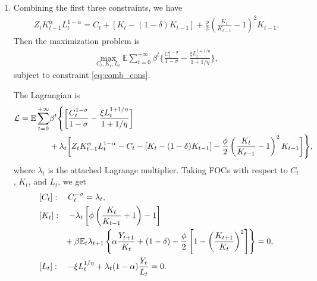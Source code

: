 \documentclass[12pt]{article}
\begin{document}
\begin{enumerate}[label=(\alph*)]
    \item Combining the first three constraints, we have
    \begin{align}\label{eq:comb_cons}
        Z_t K_{t-1}^{\alpha} L_t^{1-\alpha} = C_t + [K_t - (1-\delta)K_{t-1}] + \frac{\phi}{2} \left( \frac{K_t}{K_{t-1}} - 1 \right)^2 K_{t-1}.
    \end{align}
    Then the maximization problem is
    \begin{align}
        \max_{C_t, K_t, L_t} \mathbb{E} \sum_{t=0}^{+\infty} \beta^t \bigg\{\frac{C_t^{1-\sigma}}{1-\sigma} - \frac{\xi L_t^{1+1/\eta}}{1+1/\eta}\bigg\},
    \end{align}
    subject to constraint \eqref{eq:comb_cons}.

    The Lagrangian is
    \begin{align}\label{eq:lagrangian}
        \mathcal{L} = \mathbb{E} \sum_{t=0}^{+\infty} &\beta^t \Bigg\{ \bigg[\frac{C_t^{1-\sigma}}{1-\sigma} - \frac{\xi L_t^{1+1/\eta}}{1+1/\eta}\bigg] \notag \\
        &+ \lambda_t \bigg[Z_t K_{t-1}^{\alpha} L_t^{1-\alpha} - C_t - [K_t - (1-\delta)K_{t-1}] - \frac{\phi}{2} \left( \frac{K_t}{K_{t-1}} - 1 \right)^2 K_{t-1}\bigg]\Bigg\},
    \end{align}
    where $\lambda_t$ is the attached Lagrange multiplier. Taking FOCs with respect to $C_t$, $K_t$, and $L_t$, we get
    \begin{align}
        &[C_t]: \quad C_t^{-\sigma} = \lambda_t, \label{eq:foc_c}\\
        &[K_t]: \quad - \lambda_t \left[\phi\left(\frac{K_t}{K_{t-1}} + 1\right) - 1\right] \notag \\
        & \qquad \quad + \beta \mathbb{E}_t\lambda_{t+1} \left\{\alpha \frac{Y_{t+1}}{K_t} + (1-\delta) - \frac{\phi}{2} \left[1-\left(\frac{K_{t+1}}{K_t}\right)^2\right]\right\} = 0, \label{eq:foc_k}\\
        &[L_t]: \quad -\xi L_t^{1/\eta} + \lambda_t (1-\alpha) \frac{Y_t}{L_t} = 0. \label{eq:foc_l}
    \end{align}


\end{enumerate}
\end{document}
